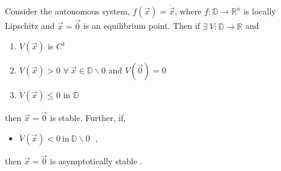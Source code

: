 \begin{minipage}{\textwidth}
\begin{theorem}
  \label{th:lyapunovStabilityTheorem}
  Consider the autonomous system, $f(\vec{x}) = \dot{\vec{x}}$, where $f : \mathbb{D} \rightarrow \mathbb{R} ^n$ is locally Lipschitz and $\vec{x}=\vec{0}$ is an equilibrium point. Then if $\exists\ V : \mathbb{D} \rightarrow \mathbb{R}$ and %
  \begin{enumerate}
    \item $V(\vec{x})$ is $C^1$
    \item $V(\vec{x}) > 0$ $\forall\ \vec{x} \in \mathbb{D}\backslash 0$ and $V(\vec{0}) = 0$
    \item $\dot{V}(\vec{x}) \leq 0$ in $\mathbb{D}$
  \end{enumerate} %
  then $\vec{x} = \vec{0}$ is stable. Further, if,
  \begin{itemize}
    \item[] $ \dot{V}(\vec{x}) < 0\ \mathrm{in}\ \mathbb{D}\backslash 0  \ \ \ ,  $
  \end{itemize}%
  then $\vec{x} = \vec{0}$ is asymptotically stable \cite{HKKhalil}.
\end{theorem}%
\end{minipage}

